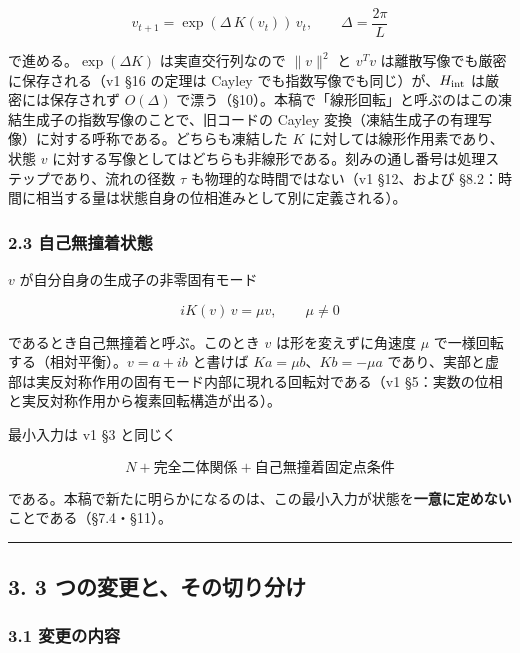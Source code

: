 \documentclass[
  10pt,
  a4paper,
]{ltjsarticle}
\begin{document}
\[
v_{t+1}=\exp(\Delta\,K(v_t))\,v_t,\qquad \Delta=\frac{2\pi}{L}
\]

で進める。\(\exp(\Delta K)\) は実直交行列なので \(\|v\|^2\) と \(v^Tv\)
は離散写像でも厳密に保存される（v1 §16 の定理は Cayley
でも指数写像でも同じ）が、\(H_{\rm int}\) は厳密には保存されず
\(O(\Delta)\)
で漂う（§10）。本稿で「線形回転」と呼ぶのはこの凍結生成子の指数写像のことで、旧コードの
Cayley 変換（凍結生成子の有理写像）に対する呼称である。どちらも凍結した
\(K\) に対しては線形作用素であり、状態 \(v\)
に対する写像としてはどちらも非線形である。刻みの通し番号は処理ステップであり、流れの径数
\(\tau\) も物理的な時間ではない（v1 §12、および
§8.2：時間に相当する量は状態自身の位相進みとして別に定義される）。

\subsubsection{2.3
自己無撞着状態}\label{ux81eaux5df1ux7121ux649eux7740ux72b6ux614b}

\(v\) が自分自身の生成子の非零固有モード

\[
iK(v)\,v=\mu v,\qquad \mu\neq0
\]

であるとき自己無撞着と呼ぶ。このとき \(v\) は形を変えずに角速度 \(\mu\)
で一様回転する（相対平衡）。\(v=a+ib\) と書けば
\(Ka=\mu b\)、\(Kb=-\mu a\)
であり、実部と虚部は実反対称作用の固有モード内部に現れる回転対である（v1
§5：実数の位相と実反対称作用から複素回転構造が出る）。

最小入力は v1 §3 と同じく

\[
N+\text{完全二体関係}+\text{自己無撞着固定点条件}
\]

である。本稿で新たに明らかになるのは、この最小入力が状態を\textbf{一意に定めない}ことである（§7.4・§11）。

\begin{center}\rule{0.5\linewidth}{0.5pt}\end{center}

\subsection{3. 3
つの変更と、その切り分け}\label{ux3064ux306eux5909ux66f4ux3068ux305dux306eux5207ux308aux5206ux3051}

\subsubsection{3.1 変更の内容}\label{ux5909ux66f4ux306eux5185ux5bb9}
\end{document}
